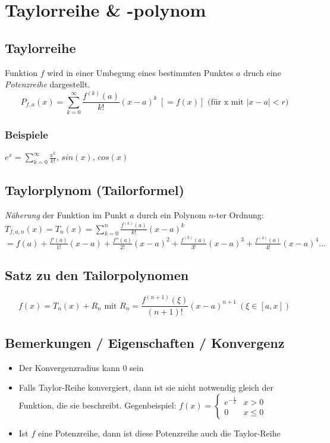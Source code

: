 \section{Taylorreihe \& -polynom}

\subsection{Taylorreihe}
Funktion $f$ wird in einer Umbegung eines bestimmten Punktes $a$ druch eine \textit{Potenzreihe} dargestellt.
\[
	P_{f,a}(x) = \sum_{k=0}^\infty \frac{f^{(k)}(a)}{k!} (x-a)^k 
	\ [= f(x)] \text{ (für x mit } |x-a| < r \text{)}
\]

\subsubsection{Beispiele}
$e^x = \sum_{k=0}^{\infty} \frac{x^k}{k!}$, $sin(x)$, $cos(x)$

\subsection{Taylorplynom (Tailorformel)}
\textit{Näherung} der Funktion im Punkt $a$ durch ein Polynom $n$-ter Ordnung:
$T_{f,a,n}(x) = T_n(x) = \sum_{k=0}^n \frac{f^{(k)}(a)}{k!} (x-a)^k$\newline
{\small
	$= f(a) + \frac{f'(a)}{1!}(x-a) + \frac{f''(a)}{2!}(x-a)^2 +
	\frac{f^{(3)}(a)}{3!}(x-a)^3 + \frac{f^{(4)}(a)}{4!}(x-a)^4\ldots$
}

\subsection{Satz zu den Tailorpolynomen}

\[
	f(x) = T_n(x) + R_n \text{ mit } R_n = \frac{f^{(n+1)}(\xi)}{(n+1)!} (x-a)^{n+1} \
	(\xi \in [a,x])
\]

\subsection{Bemerkungen / Eigenschaften / Konvergenz}
\begin{itemize}
	\item Der Konvergenzradius kann 0 sein
	\item Falls Taylor-Reihe konvergiert, dann ist sie nicht notwendig gleich
	der Funktion, die sie beschreibt. Gegenbeispiel:
	$f(x) = \begin{cases}
	e^{-\frac{1}{x}} & x > 0\\
	0 & x \leq 0\end{cases}$
	\item Ist $f$ eine Potenzreihe, dann ist diese Potenzreihe auch die Taylor-Reihe
\end{itemize}